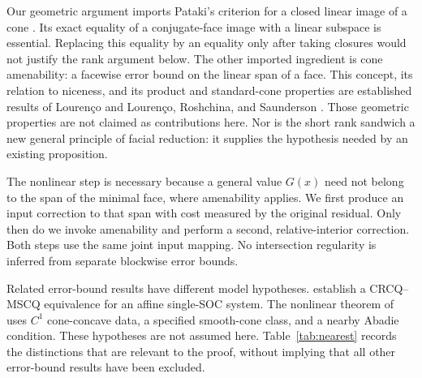 \documentclass[11pt]{article}
\numberwithin{equation}{section}
\theoremstyle{definition}
\theoremstyle{remark}
\begin{document}
Our geometric argument imports Pataki's criterion for a closed linear
image of a cone \citep[Theorem~1.1]{pataki2007}. Its exact equality of a conjugate-face image with a
linear subspace is essential. Replacing this equality by an equality
only after taking closures would not justify the rank argument below.
The other imported ingredient is cone amenability: a facewise error
bound on the linear span of a face. This concept, its relation to
niceness, and its product and standard-cone properties are established
results of Louren\c{c}o \citep{lourencoAmenable} and
Louren\c{c}o, Roshchina, and Saunderson \citep{lrs2022}.
Those geometric properties are not claimed as contributions here.
Nor is the short rank sandwich a new general principle of facial
reduction: it supplies the hypothesis needed by an existing proposition.

The nonlinear step is necessary because a general value $G(x)$ need not
belong to the span of the minimal face, where amenability applies. We
first produce an input correction to that span with cost measured by the
original residual. Only then do we invoke amenability and perform a
second, relative-interior correction. Both steps use the same joint input
mapping. No intersection regularity is inferred from separate blockwise
error bounds.

Related error-bound results have different model hypotheses.
\citet[Theorem~5.1]{chieu2026soc} establish a CRCQ--MSCQ equivalence for
an affine single-SOC system. The nonlinear theorem of
\citet[Theorem~4.1]{huy2025cone} uses $C^1$ cone-concave data, a specified
smooth-cone class, and a nearby Abadie condition. These hypotheses are
not assumed here. Table~\ref{tab:nearest} records the distinctions that
are relevant to the proof, without implying that all other error-bound
results have been excluded.
\end{document}

